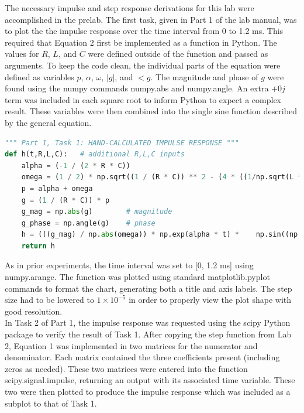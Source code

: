 \documentclass[12pt]{report}
\begin{document}
The necessary impulse and step response derivations for this lab were accomplished in the prelab. The first task, given in Part 1 of the lab manual, was to plot the the impulse response over the time interval from 0 to 1.2 ms. This required that Equation 2 first be implemented as a function in Python. The values for $ R $, $ L $, and $ C $ were defined outside of the function and passed as arguments. To keep the code clean, the individual parts of the equation were defined as variables $ p $, $ \alpha $, $ \omega $, $ |g| $, and $ <g $. The magnitude and phase of $ g $ were found using the numpy commands numpy.abs and numpy.angle. An extra $ + 0j $ term was included in each square root to inform Python to expect a complex result. These variables were then combined into the single sine function described by the general equation. \\

\begin{lstlisting}[language=Python]
""" Part 1, Task 1: HAND-CALCULATED IMPULSE RESPONSE """	
def h(t,R,L,C):   # additional R,L,C inputs  
	alpha = (-1 / (2 * R * C))
	omega = (1 / 2) * np.sqrt((1 / (R * C)) ** 2 - (4 * ((1/np.sqrt(L * C)) ** 2)) + 0 * 1j)
	p = alpha + omega  
	g = (1 / (R * C)) * p 
	g_mag = np.abs(g)        # magnitude
	g_phase = np.angle(g)    # phase
	h = (((g_mag) / np.abs(omega)) * np.exp(alpha * t) * 	np.sin((np.abs(omega) * t) + g_phase)) * u(t)
	return h
\end{lstlisting}

As in prior experiments, the time interval was set to [0, 1.2 ms] using numpy.arange. The function was plotted using standard matplotlib.pyplot commands to format the chart, generating both a title and axis labels. The step size had to be lowered to $ 1 \times 10^{-5} $ in order to properly view the plot shape with good resolution. \\

In Task 2 of Part 1, the impulse response was requested using the scipy Python package to verify the result of Task 1. After copying the step function from Lab 2, Equation 1 was implemented in two matrices for the numerator and denominator. Each matrix contained the three coefficients present (including zeros as needed). These two matrices were entered into the function scipy.signal.impulse, returning an output with its associated time variable. These two were then plotted to produce the impulse response which was included as a subplot to that of Task 1. \\
\end{document}
